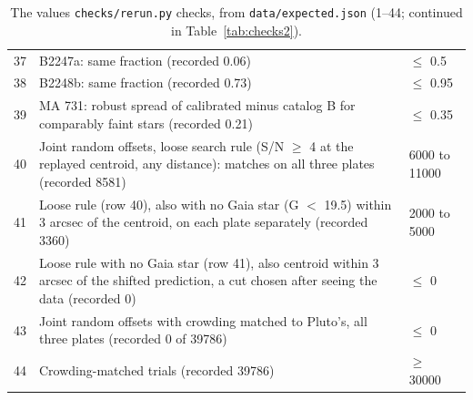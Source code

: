 \documentclass[11pt]{article}
\begin{document}
\begin{appendices}
\begin{table}[p]
\begin{tabular}{@{}rp{}l@{}}
37 & B2247a: same fraction (recorded 0.06) & $\le$ 0.5 \\
38 & B2248b: same fraction (recorded 0.73) & $\le$ 0.95 \\
39 & MA 731: robust spread of calibrated minus catalog B for comparably faint stars (recorded 0.21) & $\le$ 0.35 \\
40 & Joint random offsets, loose search rule (S/N $\ge$ 4 at the replayed centroid, any distance): matches on all three plates (recorded 8581) & 6000 to 11000 \\
41 & Loose rule (row 40), also with no Gaia star (G $<$ 19.5) within 3 arcsec of the centroid, on each plate separately (recorded 3360) & 2000 to 5000 \\
42 & Loose rule with no Gaia star (row 41), also centroid within 3 arcsec of the shifted prediction, a cut chosen after seeing the data (recorded 0) & $\le$ 0 \\
43 & Joint random offsets with crowding matched to Pluto's, all three plates (recorded 0 of 39786) & $\le$ 0 \\
44 & Crowding-matched trials (recorded 39786) & $\ge$ 30000 \\
\bottomrule
\end{tabular}
\caption{The values \texttt{checks/rerun.py} checks, from \texttt{data/expected.json} (1--44; continued in Table~\ref{tab:checks2}).}
\label{tab:checks}
\end{table}


\end{appendices}
\end{document}
